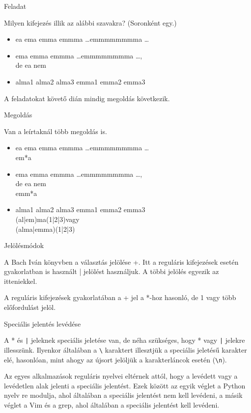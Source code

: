\documentclass[
    ignorenonframetext
    ]{beamer}
\begin{document}
\begin{frame}
    {Feladat}

    Milyen kifejezés illik az alábbi szavakra? (Soronként egy.)

    \begin{itemize}
        \item ea ema emma emmma \ldots emmmmmmmma \ldots
        \item ema emma emmma \ldots emmmmmmmma \ldots,\\
            de ea nem
        \item alma1 alma2 alma3 emma1 emma2 emma3
    \end{itemize}

    A feladatokat követő dián mindig megoldás következik.
\end{frame}

\begin{frame}
    {Megoldás}

    Van a leírtaknál több megoldás is.

    \begin{itemize}
        \item ea ema emma emmma \ldots emmmmmmmma \ldots\\
            em*a
        \item ema emma emmma \ldots emmmmmmmma \ldots,\\
            de ea nem\\
            emm*a
        \item alma1 alma2 alma3 emma1 emma2 emma3\\
            (al|em)ma(1|2|3)\qquad   vagy\\
            (alma|emma)(1|2|3)
    \end{itemize}
\end{frame}

\begin{frame}
    {Jelölésmódok}

    A Bach Iván könyvben a választás jelölése +. Itt a
    reguláris kifejezések esetén  gyakorlatban is használt | jelölést
    használjuk. A többi jelölés egyezik az itteniekkel.

    A reguláris kifejezések gyakorlatában a + jel a *-hoz hasonló, de 1
    vagy több előfordulást jelöl.
\end{frame}

\begin{frame}[fragile]
    {Speciális jelentés levédése}

    A * és \verb"|" jeleknek speciális jeletése van, de néha szükséges, hogy *
    vagy \verb"|" jelekre illesszünk. Ilyenkor általában a \verb"\" karaktert
    illesztjük a speciális jeletésű karakter elé, hasonlóan, mint ahogy
    az újsort jelöljük a karakterláncok esetén (\verb!\n!).

    Az egyes alkalmazások reguláris nyelvei eltérnek attól, hogy a
    levédett vagy a levédetlen alak jelenti a speciális jelentést. Ezek
    között az egyik véglet a Python nyelv re modulja, ahol általában a
    speciális jelentést nem kell levédeni, a másik véglet a Vim és a
    grep, ahol általában a speciális jelentést kell levédeni.
\end{frame}
\end{document}
